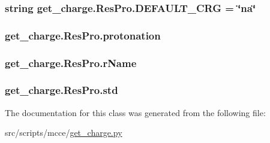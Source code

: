 \hypertarget{classget__charge_1_1_res_pro_a6abe27b9c2d55e6f735eb1afe0a83916}{
\subsubsection[{D\-E\-F\-A\-U\-L\-T\-\_\-\-C\-R\-G}]{\setlength{\rightskip}{0pt plus 5cm}string get\-\_\-charge.\-Res\-Pro.\-D\-E\-F\-A\-U\-L\-T\-\_\-\-C\-R\-G = \char`\"{}na\char`\"{}\hspace{0.3cm}{\ttfamily [static]}}}\label{classget__charge_1_1_res_pro_a6abe27b9c2d55e6f735eb1afe0a83916}
\hypertarget{classget__charge_1_1_res_pro_a0f70c65e6cef508bcd63147ad7265fee}{
\subsubsection[{protonation}]{\setlength{\rightskip}{0pt plus 5cm}get\-\_\-charge.\-Res\-Pro.\-protonation}}\label{classget__charge_1_1_res_pro_a0f70c65e6cef508bcd63147ad7265fee}
\hypertarget{classget__charge_1_1_res_pro_af00fc3f5bae5c3d3734b384b2d2c466d}{
\subsubsection[{r\-Name}]{\setlength{\rightskip}{0pt plus 5cm}get\-\_\-charge.\-Res\-Pro.\-r\-Name}}\label{classget__charge_1_1_res_pro_af00fc3f5bae5c3d3734b384b2d2c466d}
\hypertarget{classget__charge_1_1_res_pro_afad79b4ab35532abe9a7d305725fb0bc}{
\subsubsection[{std}]{\setlength{\rightskip}{0pt plus 5cm}get\-\_\-charge.\-Res\-Pro.\-std}}\label{classget__charge_1_1_res_pro_afad79b4ab35532abe9a7d305725fb0bc}


The documentation for this class was generated from the following file\-:\begin{DoxyCompactItemize}
\item 
src/scripts/mcce/\hyperlink{get__charge_8py}{get\-\_\-charge.\-py}\end{DoxyCompactItemize}
